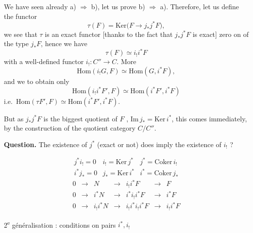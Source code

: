 \documentclass[11pt,a4paper]{article}
\begin{document}
We have seen already a) $\Longrightarrow$ b), let us prove b)
$\Longrightarrow$ a). Therefore, let us define the functor
\[
  \tau(F) = \mathrm{Ker}\bigl(F \longrightarrow j_{*} j^{*} F\bigr) ,
\]
we see that $\tau$ is an \struck{\ill{}} exact functor [thanks to the fact that
$j_{*} j^{*} F$ is exact] zero on \ill{} of the type $j_{*}F$,
\struck{\ill{}} hence we have
\[
  \tau(F) \simeq i_{!} i^{*} F
\]
with a well-defined  functor $i_{!} : C'' \to C$. More \ill{}
\marginal{\ill{}}
\[
  \mathrm{Hom}(i_{!}G, F) \simeq \mathrm{Hom}(G, i^{*}F) ,
\]
and we  to obtain only
\[
  \mathrm{Hom}(i_{!} i^{*}F', F) \simeq \mathrm{Hom}(i^{*}F', i^{*}F)
\]
i.e.\ $\mathrm{Hom}(\tau F', F) \simeq \mathrm{Hom}(i^{*}F', i^{*}F)$.

But as $j_{*} j^{*} F$ is the biggest \struck{\ill{}} quotient of $F$
\struck{\ill{}}, $\mathrm{Im}\, j_{*} = \mathrm{Ker}\, i^{*}$, this comes
\ill{} immediately, by the construction of the quotient category $C/C''$.

\textbf{Question.}  The existence of $j^{*}$ (exact or not) does
\struck{\ill{}} imply the existence of $i_{!}$ ?


\[
  \begin{array}{lll}
    j^{*} i_{!} = 0 & i_{!} = \mathrm{Ker}\, j^{*} & j^{*} = \mathrm{Coker}\, i_{!} \\
    i^{*} j_{*} = 0 & j_{*} = \mathrm{Ker}\, i^{*} & i^{*} = \mathrm{Coker}\, j_{*}
  \end{array}
\]
\[
  \begin{array}{ccccccc}
    0 & \to & N & \to & i_{!} i^{*} F & \to & F \\
    0 & \to & i^{*}N & \to & i^{*} i_{!} i^{*} F & \to & i^{*}F \\
    0 & \to & i_{!} i^{*} N & \to & i_{!} i^{*} i_{!} i^{*} F & \to & i_{!} i^{*} F
  \end{array}
\]


2\textsuperscript{e} généralisation : conditions on pairs $i^{*}, i_{!}$
\end{document}
